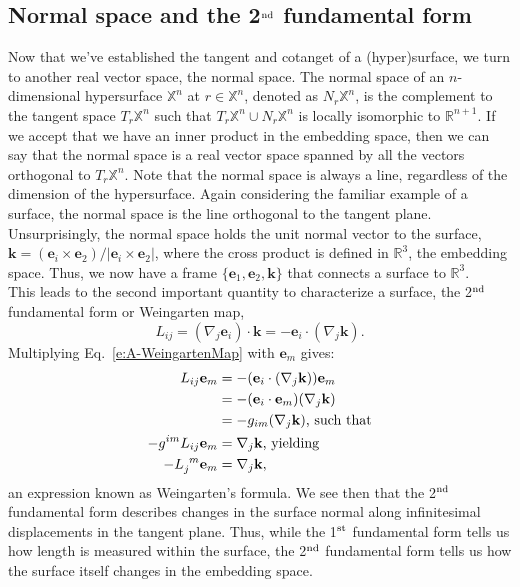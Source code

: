 \begin{appendices}
\section{Normal space and the 2$^{\rm nd}$ fundamental form}
Now that we've established the tangent and cotanget of a (hyper)surface, we turn to another real vector space, the normal space.
The normal space of an $n$-dimensional hypersurface $\mathbb{X}^n$ at $r\in \mathbb{X}^n$, denoted as $N_r\mathbb{X}^n$, is the complement to the tangent space $T_r\mathbb{X}^n$ such that $T_r\mathbb{X}^n \cup N_r\mathbb{X}^n$ is locally isomorphic to $\mathbb{R}^{n+1}$.
If we accept that we have an inner product in the embedding space, then we can say that the normal space is a real vector space spanned by all the vectors orthogonal to $T_r\mathbb{X}^n$.
Note that the normal space is always a line, regardless of the dimension of the hypersurface.
Again considering the familiar example of a surface, the normal space is the line orthogonal to the tangent plane.
Unsurprisingly, the normal space holds the unit normal vector to the surface, $\mathbf{k} = (\mathbf{e}_i \times \mathbf{e}_2)/|\mathbf{e}_i \times \mathbf{e}_2|$, where the cross product is defined in $\mathbb{R}^3$, the embedding space.
Thus, we now have a frame $\{\mathbf{e}_1, \mathbf{e}_2, \mathbf{k}\}$ that connects a surface to $\mathbb{R}^3$. \\

This leads to the second important quantity to characterize a surface, the 2$^{\rm nd}$ fundamental form or Weingarten map,
\begin{equation}
  L_{ij} = (\nabla_j \mathbf{e}_i) \cdot \mathbf{k} = -\mathbf{e}_i \cdot (\nabla_j \mathbf{k}).\label{e:A-WeingartenMap}
\end{equation}
Multiplying Eq.~\ref{e:A-WeingartenMap} with $\mathbf{e}_m$ gives:
\begin{align}
  L_{ij}\mathbf{e}_m &= -(\mathbf{e}_i \cdot (\nabla_j \mathbf{k}))\mathbf{e}_m \nonumber \\
  &= -(\mathbf{e}_i \cdot \mathbf{e}_m)(\nabla_j \mathbf{k})\nonumber \\
  &= -g_{im}(\nabla_j \mathbf{k})\textrm{, such that} \nonumber \\
  -g^{im}L_{ij}\mathbf{e}_m &= \nabla_j \mathbf{k}\textrm{, yielding} \nonumber \\
  -\tensor{L}{_j^m}\mathbf{e}_m &= \nabla_j \mathbf{k},\label{e:A-WeingartenFormula}
\end{align}
an expression known as Weingarten's formula.
We see then that the 2$^{\rm nd}$ fundamental form describes changes in the surface normal along infinitesimal displacements in the tangent plane.
Thus, while the 1$^{\rm st}$ fundamental form tells us how length is measured within the surface, the 2$^{\rm nd}$ fundamental form tells us how the surface itself changes in the embedding space. \\


\end{appendices}
